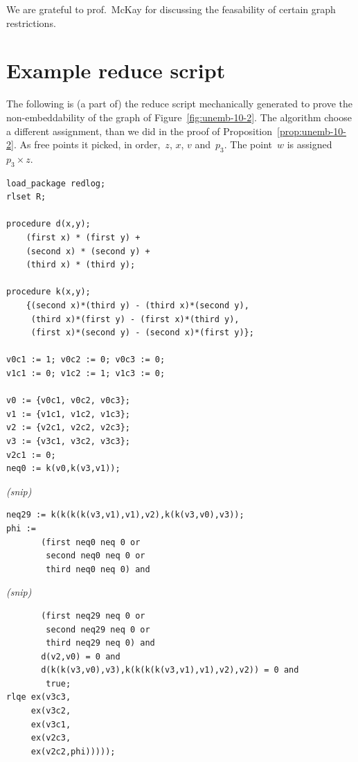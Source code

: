 \documentclass[a4paper]{article}
\newcounter{main}
\theoremstyle{definition}
\theoremstyle{remark}
\begin{document}
We are grateful to prof.~McKay for discussing
the feasability of certain graph restrictions.

\appendix
\section{Example reduce script}\label{adx:unemb-10-2}
The following is (a part of) the reduce script mechanically generated
to prove the non-embeddability of the graph of Figure~\ref{fig:unemb-10-2}.
The algorithm choose a different assignment, than we did in the
proof of Proposition~\ref{prop:unemb-10-2}.
As free points it picked, in order,~$z$, $x$, $v$ and~$p_3$.
The point~$w$ is assigned~$p_3 \times z$.
\begin{verbatim}
load_package redlog;
rlset R;

procedure d(x,y);
    (first x) * (first y) +
    (second x) * (second y) +
    (third x) * (third y);

procedure k(x,y);
    {(second x)*(third y) - (third x)*(second y),
     (third x)*(first y) - (first x)*(third y),
     (first x)*(second y) - (second x)*(first y)};

v0c1 := 1; v0c2 := 0; v0c3 := 0;
v1c1 := 0; v1c2 := 1; v1c3 := 0;

v0 := {v0c1, v0c2, v0c3}; 
v1 := {v1c1, v1c2, v1c3}; 
v2 := {v2c1, v2c2, v2c3}; 
v3 := {v3c1, v3c2, v3c3}; 
v2c1 := 0;
neq0 := k(v0,k(v3,v1)); 
\end{verbatim}
\begin{center} \emph{(snip)} \end{center}
\begin{verbatim}
neq29 := k(k(k(k(v3,v1),v1),v2),k(k(v3,v0),v3)); 
phi := 
       (first neq0 neq 0 or
        second neq0 neq 0 or
        third neq0 neq 0) and 
\end{verbatim}
\begin{center} \emph{(snip)} \end{center}
\begin{verbatim}
       (first neq29 neq 0 or
        second neq29 neq 0 or
        third neq29 neq 0) and 
       d(v2,v0) = 0 and 
       d(k(k(v3,v0),v3),k(k(k(k(v3,v1),v1),v2),v2)) = 0 and 
        true;
rlqe ex(v3c3,
     ex(v3c2,
     ex(v3c1,
     ex(v2c3,
     ex(v2c2,phi)))));
\end{verbatim}


{}

\end{document}
